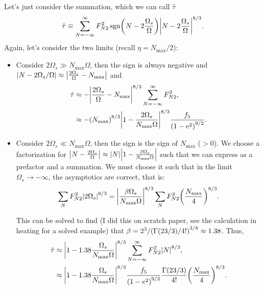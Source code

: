 \documentclass[11pt,
        usenames, %
        dvipsnames %
    ]{article}
\DeclareMathOperator{\sgn}{sgn}
\DeclarePairedDelimiter\abs{\lvert}{\rvert}
\DeclarePairedDelimiter\p{\lparen}{\rparen}
\begin{document}
Let's just consider the summation, which we can call $\hat{\tau}$
\begin{equation}
    \hat{\tau} \equiv \sum\limits_{N = -\infty}^\infty
        F_{N2}^2 \sgn\p*{N - 2\frac{\Omega_s}{\Omega}}
            \abs*{N - 2\frac{\Omega_s}{\Omega}}^{8/3}.
\end{equation}
Again, let's consider the two limits (recall $\eta = N_{\max} / 2$):
\begin{itemize}
    \item Consider $2\Omega_s \gg N_{\max}\Omega$, then the sign is always
        negative and $\abs*{N - 2\Omega_s/\Omega} \approx
        \abs*{\frac{2\Omega_s}{\Omega} - N_{\max}}$ and
        \begin{align}
            \hat{\tau}
                &\approx -\abs*{\frac{2\Omega_s}{\Omega} - N_{\max}}^{8/3}
                    \sum\limits_{N = -\infty}^\infty F_{N2}^2,\\
                &\approx -\p*{N_{\max}}^{8/3}
                    \abs*{1 - \frac{2\Omega_s}{N_{\max}\Omega}}^{8/3}
                    \frac{f_5}{\p*{1 - e^2}^{9/2}}.
        \end{align}

    \item Consider $2\Omega_s \ll N_{\max} \Omega$, then the sign is the
        sign of $N_{\max}$ ($>0$). We choose a factorization for $\abs*{N -
        \frac{2\Omega_s}{\Omega}} \approx \abs*{N}\abs*{1 -
        \frac{\beta\Omega_s}{N_{\max}\Omega}}$ such that we can express as a
        prefactor and a summation. We must choose it such that in the limit
        $\Omega_s \to -\infty$, the asymptotics are correct, that is:
        \begin{equation}
            \sum\limits_{N} F_{N2}^2 \abs*{2\Omega_s}^{8/3}
                = \abs*{\frac{\beta\Omega_s}{N_{\max}\Omega}}^{8/3}
                    \sum\limits_{N}F_{N2}^2 \p*{\frac{N_{\max}}{4}}^{8/3}.
        \end{equation}

        This can be solved to find (I did this on scratch paper, see the
        calculation in heating for a solved example) that $\beta =
        2^3 / \p*{\Gamma(23/3) / 4!}^{3/8} \approx 1.38$. Thus,
        \begin{align}
            \hat{\tau}
                &\approx \abs*{1 - 1.38\frac{\Omega_s}{N_{\max}\Omega}}^{8/3}
                    \sum\limits_{N = -\infty}^\infty F_{N2}^2 \abs*{N}^{8/3},\\
                &\approx \abs*{1 - 1.38\frac{\Omega_s}{N_{\max}\Omega}}^{8/3}
                    \frac{f_5}{\p*{1 - e^2}^{9/2}}
                    \frac{\Gamma(23/3)}{4!}
                    \p*{\frac{N_{\max}}{4}}^{8/3}.
        \end{align}
\end{itemize}
\end{document}
